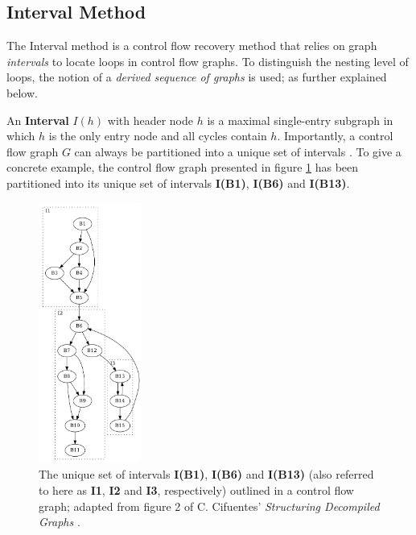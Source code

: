 
\subsection{Interval Method}
\label{sec:interval_method}

The Interval method is a control flow recovery method that relies on graph \textit{intervals} to locate loops in control flow graphs. To distinguish the nesting level of loops, the notion of a \textit{derived sequence of graphs} is used; as further explained below.


An \textbf{Interval} $I(h)$ with header node $h$ is a maximal single-entry subgraph in which $h$ is the only entry node and all cycles contain $h$. Importantly, a control flow graph $G$ can always be partitioned into a unique set of intervals \cite{structuring_algorithm_for_decompilation}. To give a concrete example, the control flow graph presented in figure \ref{fig:interval} has been partitioned into its unique set of intervals \textbf{I(B1)}, \textbf{I(B6)} and \textbf{I(B13)}.

\begin{figure}[htbp]
	\centering
	\includegraphics[width=0.3\textwidth]{inc/appendices/vocabulary/interval.png}
	\caption{The unique set of intervals \textbf{I(B1)}, \textbf{I(B6)} and \textbf{I(B13)} (also referred to here as \textbf{I1}, \textbf{I2} and \textbf{I3}, respectively) outlined in a control flow graph; adapted from figure 2 of C. Cifuentes' \textit{Structuring Decompiled Graphs} \cite{structuring_decompiled_graphs}.}
	\label{fig:interval}
\end{figure}


